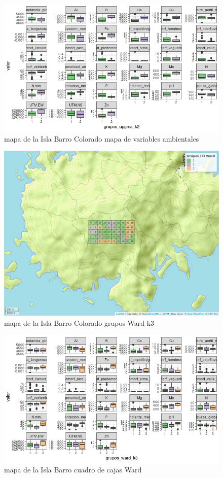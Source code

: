 \documentclass[11pt,]{article}
\begin{document}
\begin{figure}
\centering
\includegraphics[width=1.00000\textwidth]{mapas_variables_ambientales.png}
\caption{mapa de la Isla Barro Colorado mapa de variables ambientales
\label{fig:bci_map}}
\end{figure}

\begin{figure}
\centering
\includegraphics[width=1.00000\textwidth]{mapa_ward_k3.png}
\caption{mapa de la Isla Barro Colorado grupos Ward k3
\label{fig:bci_map}}
\end{figure}

\begin{figure}
\centering
\includegraphics[width=1.00000\textwidth]{cuadro_cajas_ward.png}
\caption{mapa de la Isla Barro cuadro de cajas Ward \label{fig:bci_map}}
\end{figure}
\end{document}
